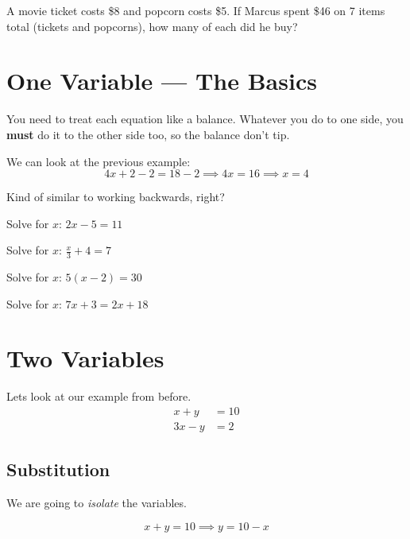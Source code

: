\documentclass{article}
\theoremstyle{mytheoremstyle}
\theoremstyle{mytheoremstyle}
\theoremstyle{myproblemstyle}
\theoremstyle{myproblemstyle}
\begin{document}
    \begin{problem}
        A movie ticket costs \$8 and popcorn costs \$5. If Marcus spent \$46 on 7 items total (tickets and popcorns), how many of each did he buy?
    \end{problem}
    

    \section{One Variable — The Basics}

    You need to treat each equation like a balance. Whatever you do to one side, you \textbf{must} do it to the other side too, so the balance don't tip.

    We can look at the previous example:
    \[4x + 2 - 2 = 18 - 2 \implies 4x = 16 \implies x = 4\]

    Kind of similar to working backwards, right?

    \begin{problem}
        Solve for $x$: $2x - 5 = 11$
    \end{problem}

    \begin{problem}
        Solve for $x$: $\frac{x}{3} + 4 = 7$
    \end{problem}

    \begin{problem}
        Solve for $x$: $5(x - 2) = 30$
    \end{problem}

    \begin{problem}
        Solve for $x$: $7x + 3 = 2x + 18$
    \end{problem}


    \section{Two Variables}
    Lets look at our example from before. 
    \begin{align*}
        x + y &= 10 \\
        3x - y &= 2
    \end{align*}

    \subsection{Substitution}
    We are going to \textit{isolate} the variables.

    \[x + y = 10 \implies y = 10 - x\]
\end{document}

